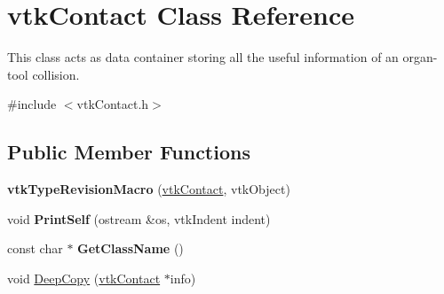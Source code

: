 \hypertarget{classvtkContact}{
\section{vtkContact Class Reference}
\label{classvtkContact}
}


This class acts as data container storing all the useful information of an organ-\/tool collision.  


{\ttfamily \#include $<$vtkContact.h$>$}\subsection*{Public Member Functions}
\begin{DoxyCompactItemize}
\item 
\hypertarget{classvtkContact_ae57bab296a089fb62a3fb1951e49076e}{
{\bfseries vtkTypeRevisionMacro} (\hyperlink{classvtkContact}{vtkContact}, vtkObject)}
\label{classvtkContact_ae57bab296a089fb62a3fb1951e49076e}

\item 
\hypertarget{classvtkContact_acd0d47e3a3f2515ad82c109a054f0b95}{
void {\bfseries PrintSelf} (ostream \&os, vtkIndent indent)}
\label{classvtkContact_acd0d47e3a3f2515ad82c109a054f0b95}

\item 
\hypertarget{classvtkContact_a7547cfce378859302822189175735b2a}{
const char $\ast$ {\bfseries GetClassName} ()}
\label{classvtkContact_a7547cfce378859302822189175735b2a}

\item 
\hypertarget{classvtkContact_acff6607cd121ba61bdc2a92615cfb133}{
void \hyperlink{classvtkContact_acff6607cd121ba61bdc2a92615cfb133}{DeepCopy} (\hyperlink{classvtkContact}{vtkContact} $\ast$info)}
\label{classvtkContact_acff6607cd121ba61bdc2a92615cfb133}


\end{DoxyCompactItemize}
